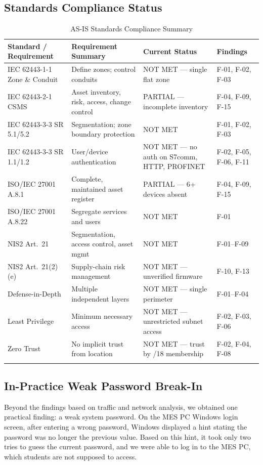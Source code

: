\documentclass[11pt,a4paper]{article}
\begin{document}
\subsection{Standards Compliance Status}
\begin{longtable}{L{3.6cm} L{4.6cm} L{3.8cm} L{2.6cm}}
\textbf{Standard / Requirement} & \textbf{Requirement Summary} & \textbf{Current Status} & \textbf{Findings} \\
\midrule \endhead
IEC 62443-1-1 Zone \& Conduit & Define zones; control conduits & NOT MET --- single flat zone & F-01, F-02, F-03 \\
IEC 62443-2-1 CSMS & Asset inventory, risk, access, change control & PARTIAL --- incomplete inventory & F-04, F-09, F-15 \\
IEC 62443-3-3 SR 5.1/5.2 & Segmentation; zone boundary protection & NOT MET & F-01, F-02, F-03 \\
IEC 62443-3-3 SR 1.1/1.2 & User/device authentication & NOT MET --- no auth on S7comm, HTTP, PROFINET & F-02, F-05, F-06, F-11 \\
ISO/IEC 27001 A.8.1 & Complete, maintained asset register & PARTIAL --- 6+ devices absent & F-04, F-09, F-15 \\
ISO/IEC 27001 A.8.22 & Segregate services and users & NOT MET & F-01 \\
NIS2 Art.~21 & Segmentation, access control, asset mgmt & NOT MET & F-01--F-09 \\
NIS2 Art.~21(2)(e) & Supply-chain risk management & NOT MET --- unverified firmware & F-10, F-13 \\
Defense-in-Depth & Multiple independent layers & NOT MET --- single perimeter & F-01--F-04 \\
Least Privilege & Minimum necessary access & NOT MET --- unrestricted subnet access & F-02, F-03, F-06 \\
Zero Trust & No implicit trust from location & NOT MET --- trust by /18 membership & F-02, F-04, F-08 \\
\midrule
\caption{AS-IS Standards Compliance Summary}\\
\end{longtable}

\subsection{In-Practice Weak Password Break-In}
Beyond the findings based on traffic and network analysis, we
obtained one practical finding: a weak system password. On the
MES PC Windows login screen, after entering a wrong password,
Windows displayed a hint stating the password was no longer the
previous value. Based on this hint, it took only two tries to
guess the current password, and we were able to log in to the
MES PC, which students are not supposed to access.
\end{document}
